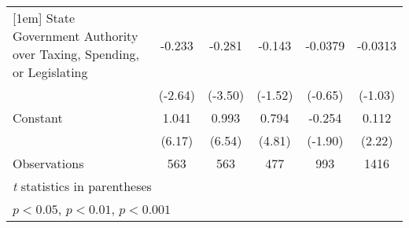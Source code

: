 {\begin{tabular*}{\linewidth}{@{\hskip\tabcolsep\extracolsep\fill}l*{5}{c}}
[1em]
State Government Authority over Taxing, Spending, or Legislating&   -0.233\sym{**} &   -0.281\sym{***}&   -0.143         &  -0.0379         &  -0.0313         \\
                &  (-2.64)         &  (-3.50)         &  (-1.52)         &  (-0.65)         &  (-1.03)         \\
[1em]
Constant        &    1.041\sym{***}&    0.993\sym{***}&    0.794\sym{***}&   -0.254         &    0.112\sym{*}  \\
                &   (6.17)         &   (6.54)         &   (4.81)         &  (-1.90)         &   (2.22)         \\
\hline
Observations    &      563         &      563         &      477         &      993         &     1416         \\
\hline\hline
\multicolumn{6}{l}{\footnotesize \textit{t} statistics in parentheses}\\
\multicolumn{6}{l}{\footnotesize \sym{*} \(p<0.05\), \sym{**} \(p<0.01\), \sym{***} \(p<0.001\)}\\
\end{tabular*}
}
